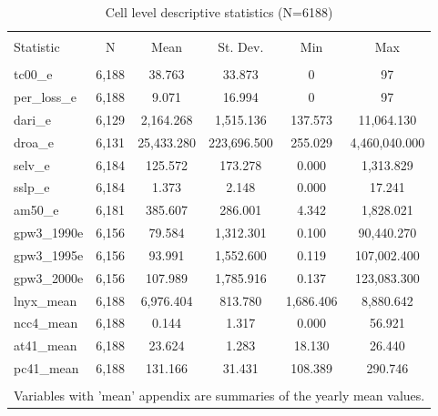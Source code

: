 \documentclass{article}\usepackage[]{graphicx}\usepackage[]{color}
\newenvironment{knitrout}{}{}  %
\begin{document}
\begin{knitrout}

\begin{table}[!htbp] \centering 
  \caption{Cell level descriptive statistics (N=6188)} 
  \label{} 
\begin{tabular}{@{\extracolsep{5pt}}lccccc} 
\\[-1.8ex]\hline 
\hline \\[-1.8ex] 
Statistic & \multicolumn{1}{c}{N} & \multicolumn{1}{c}{Mean} & \multicolumn{1}{c}{St. Dev.} & \multicolumn{1}{c}{Min} & \multicolumn{1}{c}{Max} \\ 
\hline \\[-1.8ex] 
tc00\_e & 6,188 & 38.763 & 33.873 & 0 & 97 \\ 
per\_loss\_e & 6,188 & 9.071 & 16.994 & 0 & 97 \\ 
dari\_e & 6,129 & 2,164.268 & 1,515.136 & 137.573 & 11,064.130 \\ 
droa\_e & 6,131 & 25,433.280 & 223,696.500 & 255.029 & 4,460,040.000 \\ 
selv\_e & 6,184 & 125.572 & 173.278 & 0.000 & 1,313.829 \\ 
sslp\_e & 6,184 & 1.373 & 2.148 & 0.000 & 17.241 \\ 
am50\_e & 6,181 & 385.607 & 286.001 & 4.342 & 1,828.021 \\ 
gpw3\_1990e & 6,156 & 79.584 & 1,312.301 & 0.100 & 90,440.270 \\ 
gpw3\_1995e & 6,156 & 93.991 & 1,552.600 & 0.119 & 107,002.400 \\ 
gpw3\_2000e & 6,156 & 107.989 & 1,785.916 & 0.137 & 123,083.300 \\ 
lnyx\_mean & 6,188 & 6,976.404 & 813.780 & 1,686.406 & 8,880.642 \\ 
ncc4\_mean & 6,188 & 0.144 & 1.317 & 0.000 & 56.921 \\ 
at41\_mean & 6,188 & 23.624 & 1.283 & 18.130 & 26.440 \\ 
pc41\_mean & 6,188 & 131.166 & 31.431 & 108.389 & 290.746 \\ 
\hline \\[-1.8ex] 
\multicolumn{6}{l}{Variables with 'mean' appendix are summaries of the yearly mean values.} \\ 
\end{tabular} 
\end{table} 




\end{knitrout}
\end{document}
